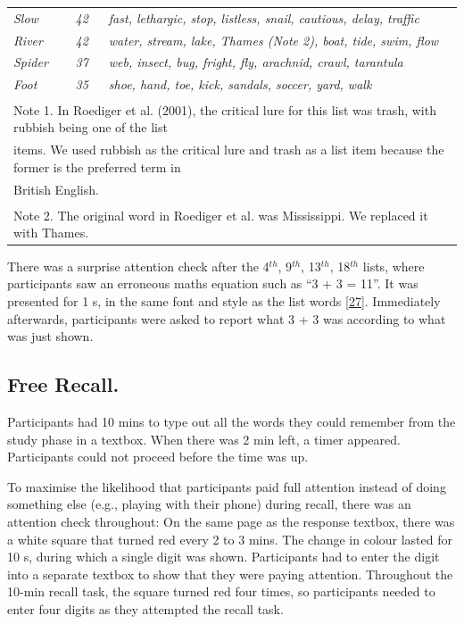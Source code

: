 \documentclass[
]{article}
\begin{document}
\begin{table}[H]
\begin{tabular}[t]{lll}
\em{Slow} & \em{42} & \em{fast, lethargic, stop, listless, snail, cautious, delay, traffic}\\
\em{River} & \em{42} & \em{water, stream, lake, Thames (Note 2), boat, tide, swim, flow}\\
\addlinespace
\em{Spider} & \em{37} & \em{web, insect, bug, fright, fly, arachnid, crawl, tarantula}\\
\em{Foot} & \em{35} & \em{shoe, hand, toe, kick, sandals, soccer, yard, walk}\\
\bottomrule
\multicolumn{3}{l}{\textsuperscript{} Note 1. In Roediger et al. (2001), the critical lure for this list was trash, with rubbish being one of the list}\\
\multicolumn{3}{l}{items. We used rubbish as the critical lure and trash as a list item because the former is the preferred term in}\\
\multicolumn{3}{l}{British English.}\\
\multicolumn{3}{l}{\textsuperscript{} Note 2. The original word in Roediger et al. was Mississippi. We replaced it with Thames.}\\
\end{tabular}
\end{table}

There was a surprise attention check after the 4\(^{th}\), 9\(^{th}\), 13\(^{th}\), 18\(^{th}\) lists, where participants saw an erroneous maths equation such as ``3 + 3 = 11''. It was presented for 1 s, in the same font and style as the list words {[}\protect\hyperlink{ref-thomas2017a}{27}{]}. Immediately afterwards, participants were asked to report what 3 + 3 was according to what was just shown.

\hypertarget{free-recall.}{%
\subsection{Free Recall.}\label{free-recall.}}

Participants had 10 mins to type out all the words they could remember from the study phase in a textbox. When there was 2 min left, a timer appeared. Participants could not proceed before the time was up.

To maximise the likelihood that participants paid full attention instead of doing something else (e.g., playing with their phone) during recall, there was an attention check throughout: On the same page as the response textbox, there was a white square that turned red every 2 to 3 mins. The change in colour lasted for 10 s, during which a single digit was shown. Participants had to enter the digit into a separate textbox to show that they were paying attention. Throughout the 10-min recall task, the square turned red four times, so participants needed to enter four digits as they attempted the recall task.
\end{document}
